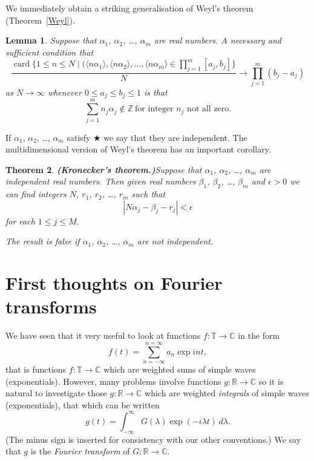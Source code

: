 \documentclass[12pt]{article}
\newtheorem{theorem}{Theorem}[section]
\newtheorem{lemma}[theorem]{Lemma}
\theoremstyle{definition}
\newcommand{\card}{\operatorname{card}}
\begin{document}
We immediately obtain a striking generalisation of
Weyl's theorem (Theorem~\ref{Weyl}).
\begin{lemma}\label{T, Weyl many} Suppose
that $\alpha_{1}$, $\alpha_{2}$, \dots, $\alpha_{m}$
are real numbers. A necessary and sufficient condition
that
\[\frac{\card\{1\leq n\leq N \mid
(\langle n\alpha_{1}\rangle,\langle n\alpha_{2}\rangle,
\dots,\langle n\alpha_{m}\rangle
\in \prod_{j=1}^{m}[a_{j},b_{j}]\}}{N}
\rightarrow \prod_{j=1}^{m}(b_{j}-a_{j})\]
as $N\rightarrow\infty$ whenever $0\leq a_{j}\leq b_{j}\leq 1$
is that
\begin{equation*}
\sum_{j=1}^{m} n_{j}\alpha_{j}\notin{\mathbb Z}
\ \text{for integer $n_{j}$ not all zero}. \tag*{$\bigstar$}
\end{equation*}
\end{lemma}
If $\alpha_{1}$, $\alpha_{2}$, \dots, $\alpha_{m}$
satisfy $\bigstar$ we say that they are independent.
The multidimensional version of Weyl's theorem has
an important corollary.
\begin{theorem}{\bf (Kronecker's theorem.)}\label{Kronecker's theorem}
Suppose
that $\alpha_{1}$, $\alpha_{2}$, \dots, $\alpha_{m}$
are independent real numbers. Then given real
numbers $\beta_{1}$, $\beta_{2}$, \dots, $\beta_{m}$
and $\epsilon>0$ we can find integers
$N$, $r_{1}$, $r_{2}$, \dots, $r_{m}$ such that
\[|N\alpha_{j}-\beta_{j}-r_{j}|<\epsilon\]
for each $1\leq j\leq M$.

The result is false if
$\alpha_{1}$, $\alpha_{2}$, \dots, $\alpha_{m}$
are not independent.
\end{theorem}
\section{First thoughts on Fourier transforms} We have
seen that it very useful to look at functions
$f:{\mathbb T}\rightarrow{\mathbb C}$ in the form
\[f(t)=\sum_{n=-\infty}^{n=\infty}a_{n}\exp int,\]
that is functions $f:{\mathbb T}\rightarrow{\mathbb C}$ which
are weighted sums of simple waves (exponentials).  
However, many problems involve functions
$g:{\mathbb R}\rightarrow{\mathbb C}$ so it is natural to 
investigate those $g:{\mathbb R}\rightarrow{\mathbb C}$
which are weighted \emph{integrals} of simple waves (exponentials),
that which can be written
\[g(t)=\int_{-\infty}^{\infty}G(\lambda)\exp(-i\lambda t)\,d\lambda.\]
(The minus sign is inserted for consistency with our other
conventions.)
We say that $g$ is the \emph{Fourier transform} 
of $G:{\mathbb R}\rightarrow{\mathbb C}$.
\end{document}
